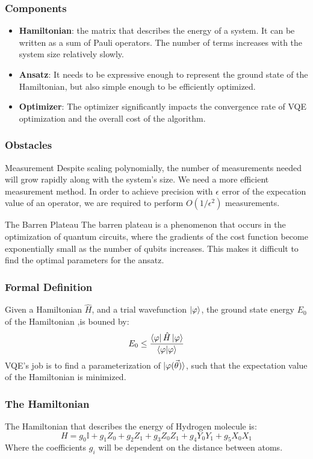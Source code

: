 \documentclass{beamer}
\begin{document}
\begin{frame}
    \frametitle{Components}
    \begin{itemize}
        \item \textbf{Hamiltonian}: the matrix that describes the energy of a system. It can be written as a sum of Pauli operators. The number
         of terms increases with the system size relatively slowly.
        \item \textbf{Ansatz}: It needs to be expressive enough to represent the ground state of the Hamiltonian, but also simple enough to be
         efficiently optimized. 
        \item \textbf{Optimizer}: The optimizer significantly impacts the convergence rate of VQE optimization and the overall cost of the algorithm.
    \end{itemize}
\end{frame}
\begin{frame}
    \frametitle{Obstacles}
    \begin{block}{Measurement}
        Despite scaling polynomially, the number of measurements needed will grow rapidly along with the system's size. We need a more efficient measurement method.
        In order to achieve precision with \(\epsilon\) error of the expecation value of an operator, we are required to perform \(O(1/\epsilon^2)\) measurements.
    \end{block}
    \begin{block}{The Barren Plateau}
        The barren plateau is a phenomenon that occurs in the optimization of quantum circuits, where the gradients of the cost function become exponentially small as the number of qubits increases. This makes it difficult to find the optimal parameters for the ansatz.
    \end{block}
\end{frame}
\begin{frame}
    \frametitle{Formal Definition}
    Given a Hamiltonian \(\hat{H}\), and a trial wavefunction \(\ket{\varphi}\), the ground state energy \(E_0\) of the Hamiltonian ,is bouned by:
    \begin{equation}
        E_0 \leq \frac{\bra{\varphi} \hat{H} \ket{\varphi}}{\braket{\varphi | \varphi}}
    \end{equation}
    VQE's job is to find a parameterization of \(\ket{\varphi(\vec{\theta})}\), such that the expectation value of the Hamiltonian is minimized.
\end{frame}
\begin{frame}
    \frametitle{The Hamiltonian}
    The Hamiltonian that describes the energy of Hydrogen molecule is:
    \begin{equation}
        H = g_0 \mathbb{I} + g_1 Z_0 + g_2 Z_1 + g_3 Z_0 Z_1 + g_4 Y_0 Y_1 + g_5 X_0 X_ 1
    \end{equation}
    Where the coefficients \(g_i\) will be dependent on the distance between atoms. 
\end{frame}
\end{document}
